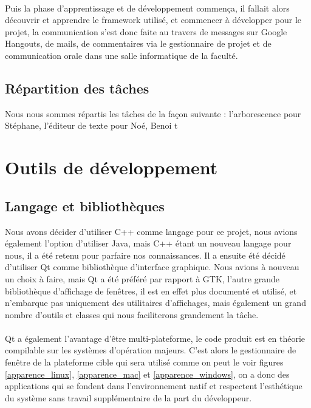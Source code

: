 \paragraph{}

Puis la phase d'apprentissage et de développement commença, il fallait alors découvrir et apprendre le framework utilisé, et commencer à développer pour le projet, la communication s'est donc faite au travers de messages sur Google Hangouts, de mails, de commentaires via le gestionnaire de projet et de communication orale dans une salle informatique de la faculté.
        
\subsection{Répartition des tâches}
Nous nous sommes répartis les tâches de la façon suivante : l'arborescence pour Stéphane, l'éditeur de texte pour Noé, Benoi t
\section{Outils de développement}

\subsection{Langage et bibliothèques}

Nous avons décider d'utiliser C++ comme langage pour ce projet, nous avions également l'option d'utiliser Java, mais C++ étant un nouveau langage pour nous, il a été retenu pour parfaire nos connaissances. Il a ensuite été décidé d'utiliser Qt comme bibliothèque d'interface graphique. Nous avions à nouveau un choix à faire, mais Qt a été préféré par rapport à GTK, l'autre grande bibliothèque d'affichage de fenêtres, il est en effet plus documenté et utilisé, et n'embarque pas uniquement des utilitaires d'affichages, mais également un grand nombre d'outils et classes qui nous faciliterons grandement la tâche.
\paragraph{}
Qt a également l'avantage d'être multi-plateforme, le code produit est en théorie compilable sur les systèmes d'opération majeurs. C'est alors le gestionnaire de fenêtre de la plateforme cible qui sera utilisé comme on peut le voir figures \ref{apparence_linux}, \ref{apparence_mac} et \ref{apparence_windows}, on a donc des applications qui se fondent dans l'environnement natif et respectent l'esthétique du système sans travail supplémentaire de la part du développeur.

